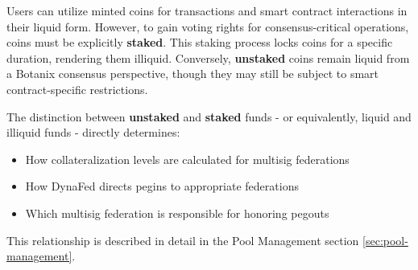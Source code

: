Users can utilize minted coins for transactions and smart contract interactions in their liquid form. However, to gain voting rights for consensus-critical operations, coins must be explicitly \textbf{staked}. This staking process locks coins for a specific duration, rendering them illiquid. Conversely, \textbf{unstaked} coins remain liquid from a Botanix consensus perspective, though they may still be subject to smart contract-specific restrictions.

The distinction between \textbf{unstaked} and \textbf{staked} funds - or equivalently, liquid and illiquid funds - directly determines:

\begin{itemize}
    \item How collateralization levels are calculated for multisig federations
    \item How DynaFed directs pegins to appropriate federations
    \item Which multisig federation is responsible for honoring pegouts
\end{itemize}

This relationship is described in detail in the Pool Management section \ref{sec:pool-management}.